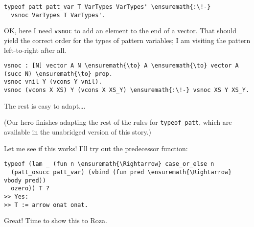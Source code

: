 \importantCodeblock{}

\begin{verbatim}
typeof_patt patt_var T VarTypes VarTypes' \ensuremath{:\!-}
  vsnoc VarTypes T VarTypes'.
\end{verbatim}

\importantCodeblockEnd{}

OK, here I need \texttt{vsnoc} to add an element to the end of a vector.
That should yield the correct order for the types of pattern variables;
I am visiting the pattern left-to-right after all.

\begin{verbatim}
vsnoc : [N] vector A N \ensuremath{\to} A \ensuremath{\to} vector A (succ N) \ensuremath{\to} prop.
vsnoc vnil Y (vcons Y vnil).
vsnoc (vcons X XS) Y (vcons X XS_Y) \ensuremath{:\!-} vsnoc XS Y XS_Y.
\end{verbatim}

The rest is easy to adapt\ldots{}.

\begin{scenecomment}
(Our hero finishes adapting the rest of the rules for \texttt{typeof\_patt},
which are available in the unabridged version of this story.)
\end{scenecomment}

Let me see if this works! I'll try out the predecessor function:

\begin{verbatim}
typeof (lam _ (fun n \ensuremath{\Rightarrow} case_or_else n
  (patt_osucc patt_var) (vbind (fun pred \ensuremath{\Rightarrow} vbody pred))
  ozero)) T ?
>> Yes:
>> T := arrow onat onat.
\end{verbatim}

Great! Time to show this to Roza.

\identDialog
